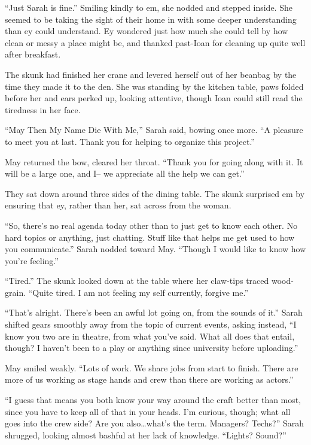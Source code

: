 ``Just Sarah is fine.'' Smiling kindly to em, she nodded and stepped inside. She seemed to be taking the sight of their home in with some deeper understanding than ey could understand. Ey wondered just how much she could tell by how clean or messy a place might be, and thanked past-Ioan for cleaning up quite well after breakfast.

The skunk had finished her crane and levered herself out of her beanbag by the time they made it to the den. She was standing by the kitchen table, paws folded before her and ears perked up, looking attentive, though Ioan could still read the tiredness in her face.

``May Then My Name Die With Me,'' Sarah said, bowing once more. ``A pleasure to meet you at last. Thank you for helping to organize this project.''

May returned the bow, cleared her throat. ``Thank you for going along with it. It will be a large one, and I-- we appreciate all the help we can get.''

They sat down around three sides of the dining table. The skunk surprised em by ensuring that ey, rather than her, sat across from the woman.

``So, there's no real agenda today other than to just get to know each other. No hard topics or anything, just chatting. Stuff like that helps me get used to how you communicate.'' Sarah nodded toward May. ``Though I would like to know how you're feeling.''

``Tired.'' The skunk looked down at the table where her claw-tips traced wood-grain. ``Quite tired. I am not feeling my self currently, forgive me.''

``That's alright. There's been an awful lot going on, from the sounds of it.'' Sarah shifted gears smoothly away from the topic of current events, asking instead, ``I know you two are in theatre, from what you've said. What all does that entail, though? I haven't been to a play or anything since university before uploading.''

May smiled weakly. ``Lots of work. We share jobs from start to finish. There are more of us working as stage hands and crew than there are working as actors.''

``I guess that means you both know your way around the craft better than most, since you have to keep all of that in your heads. I'm curious, though; what all goes into the crew side? Are you also\ldots what's the term. Managers? Techs?'' Sarah shrugged, looking almost bashful at her lack of knowledge. ``Lights? Sound?''

